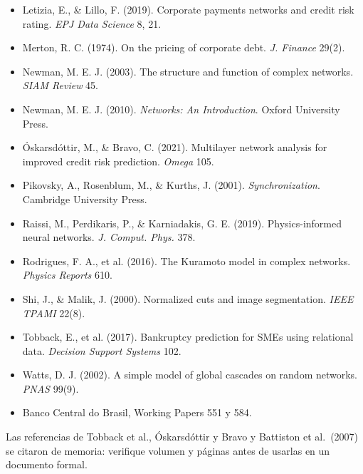 \begin{itemize}[leftmargin=*]
convolutional networks. \emph{ICLR}.
\item Letizia, E., \& Lillo, F. (2019). Corporate payments networks and credit risk
rating. \emph{EPJ Data Science} 8, 21.
\item Merton, R. C. (1974). On the pricing of corporate debt. \emph{J. Finance} 29(2).
\item Newman, M. E. J. (2003). The structure and function of complex networks.
\emph{SIAM Review} 45.
\item Newman, M. E. J. (2010). \emph{Networks: An Introduction}. Oxford University Press.
\item Óskarsdóttir, M., \& Bravo, C. (2021). Multilayer network analysis for improved
credit risk prediction. \emph{Omega} 105.
\item Pikovsky, A., Rosenblum, M., \& Kurths, J. (2001). \emph{Synchronization}.
Cambridge University Press.
\item Raissi, M., Perdikaris, P., \& Karniadakis, G. E. (2019). Physics-informed neural
networks. \emph{J. Comput. Phys.} 378.
\item Rodrigues, F. A., et al. (2016). The Kuramoto model in complex networks.
\emph{Physics Reports} 610.
\item Shi, J., \& Malik, J. (2000). Normalized cuts and image segmentation.
\emph{IEEE TPAMI} 22(8).
\item Tobback, E., et al. (2017). Bankruptcy prediction for SMEs using relational
data. \emph{Decision Support Systems} 102.
\item Watts, D. J. (2002). A simple model of global cascades on random networks.
\emph{PNAS} 99(9).
\item Banco Central do Brasil, Working Papers 551 y 584.
\end{itemize}
\begin{nota}
Las referencias de Tobback et al., Óskarsdóttir y Bravo y Battiston et al.\ (2007) se
citaron de memoria: verifique volumen y páginas antes de usarlas en un documento
formal.
\end{nota}
